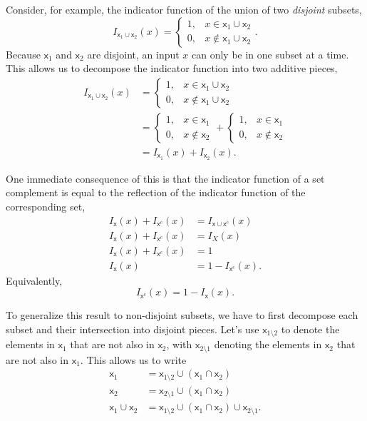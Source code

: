 \documentclass[
  letterpaper,
  DIV=11,
  numbers=noendperiod]{scrartcl}
\begin{document}
Consider, for example, the indicator function of the union of two
\emph{disjoint} subsets, \[
I_{ \mathsf{x}_{1} \cup \mathsf{x}_{2} } (x)
=
\left\{
\begin{array}{rr}
1, & x \in \mathsf{x}_{1} \cup \mathsf{x}_{2} \\
0, & x \notin \mathsf{x}_{1} \cup \mathsf{x}_{2}
\end{array}
\right. .
\] Because \(\mathsf{x}_{1}\) and \(\mathsf{x}_{2}\) are disjoint, an
input \(x\) can only be in one subset at a time. This allows us to
decompose the indicator function into two additive pieces,
\begin{align*}
I_{ \mathsf{x}_{1} \cup \mathsf{x}_{2} } (x)
&=
\left\{
\begin{array}{rr}
1, & x \in \mathsf{x}_{1} \cup \mathsf{x}_{2} \\
0, & x \notin \mathsf{x}_{1} \cup \mathsf{x}_{2}
\end{array}
\right.
\\
&=
\left\{
\begin{array}{rr}
1, & x \in \mathsf{x}_{1} \\
0, & x \notin \mathsf{x}_{2}
\end{array}
\right.
+
\left\{
\begin{array}{rr}
1, & x \in \mathsf{x}_{1} \\
0, & x \notin \mathsf{x}_{2}
\end{array}
\right.
\\
&=
I_{\mathsf{x}_{1}} (x)
+
I_{\mathsf{x}_{2}} (x).
\end{align*}

One immediate consequence of this is that the indicator function of a
set complement is equal to the reflection of the indicator function of
the corresponding set, \begin{align*}
I_{\mathsf{x}} (x)
+
I_{\mathsf{x}^{c}} (x)
&=
I_{ \mathsf{x} \cup \mathsf{x}^{c} } (x)
\\
I_{\mathsf{x}} (x)
+
I_{\mathsf{x}^{c}} (x)
&=
I_{ X } (x)
\\
I_{\mathsf{x}} (x)
+
I_{\mathsf{x}^{c}} (x)
&=
1
\\
I_{\mathsf{x}} (x)
&=
1 - I_{\mathsf{x}^{c}} (x).
\end{align*} Equivalently, \[
I_{\mathsf{x}^{c}} (x)
=
1 - I_{\mathsf{x}} (x).
\]

To generalize this result to non-disjoint subsets, we have to first
decompose each subset and their intersection into disjoint pieces. Let's
use \(\mathsf{x}_{1 \setminus 2}\) to denote the elements in
\(\mathsf{x}_{1}\) that are not also in \(\mathsf{x}_{2}\), with
\(\mathsf{x}_{2 \setminus 1}\) denoting the elements in
\(\mathsf{x}_{2}\) that are not also in \(\mathsf{x}_{1}\). This allows
us to write \begin{align*}
\mathsf{x}_{1}
&=
\mathsf{x}_{1 \setminus 2}
\cup
(\mathsf{x}_{1} \cap \mathsf{x}_{2})
\\
\mathsf{x}_{2}
&=
\mathsf{x}_{2 \setminus 1}
\cup
(\mathsf{x}_{1} \cap \mathsf{x}_{2})
\\
\mathsf{x}_{1} \cup \mathsf{x}_{2}
&=
\mathsf{x}_{1 \setminus 2}
\cup
( \mathsf{x}_{1} \cap \mathsf{x}_{2} )
\cup
\mathsf{x}_{2 \setminus 1}.
\end{align*}
\end{document}

